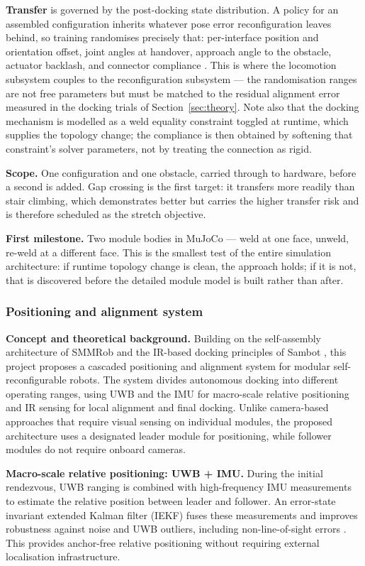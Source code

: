 \documentclass[11pt,a4paper]{article}
\newcounter{gsub}
\newcommand{\gsubsub}[1]{\subsubsection*{#1}}
\begin{document}
\noindent\textbf{Transfer} is governed by the post-docking state distribution.
A policy for an assembled configuration inherits whatever pose error
reconfiguration leaves behind, so training randomises precisely that:
per-interface position and orientation offset, joint angles at handover,
approach angle to the obstacle, actuator backlash, and connector compliance
\cite{tobin2017,peng2018}. This is where the locomotion subsystem couples to
the reconfiguration subsystem --- the randomisation ranges are not free
parameters but must be matched to the residual alignment error measured in the
docking trials of Section~\ref{sec:theory}. Note also that the docking mechanism is modelled as a
weld equality constraint toggled at runtime, which supplies the topology
change; the compliance is then obtained by softening that constraint's solver
parameters, not by treating the connection as rigid.

\noindent\textbf{Scope.} One configuration and one obstacle, carried through to
hardware, before a second is added. Gap crossing is the first target: it
transfers more readily than stair climbing, which demonstrates better but
carries the higher transfer risk and is therefore scheduled as the stretch
objective.

\noindent\textbf{First milestone.} Two module bodies in MuJoCo --- weld at one
face, unweld, re-weld at a different face. This is the smallest test of the
entire simulation architecture: if runtime topology change is clean, the
approach holds; if it is not, that is discovered before the detailed module
model is built rather than after.

\gsubsub{Positioning and alignment system}

\noindent\textbf{Concept and theoretical background.} Building on the
self-assembly architecture of SMMRob \cite{li2022} and the IR-based docking
principles of Sambot \cite{wei2011}, this project proposes a cascaded
positioning and alignment system for modular self-reconfigurable robots. The
system divides autonomous docking into different operating ranges, using UWB
and the IMU for macro-scale relative positioning and IR sensing for local
alignment and final docking. Unlike camera-based approaches that require visual
sensing on individual modules, the proposed architecture uses a designated
leader module for positioning, while follower modules do not require onboard
cameras.

\noindent\textbf{Macro-scale relative positioning: UWB + IMU.} During the
initial rendezvous, UWB ranging is combined with high-frequency IMU
measurements to estimate the relative position between leader and follower. An
error-state invariant extended Kalman filter (IEKF) fuses these measurements
and improves robustness against noise and UWB outliers, including
non-line-of-sight errors \cite{zhang2022}. This provides anchor-free relative
positioning without requiring external localisation infrastructure.
\end{document}
